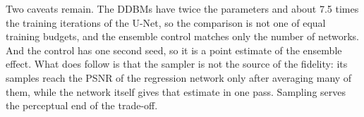 Two caveats remain. The DDBMs have twice the parameters and about 7.5 times the training iterations of the U-Net, so the comparison is not one of equal training budgets, and the ensemble control matches only the number of networks. And the control has one second seed, so it is a point estimate of the ensemble effect. What does follow is that the sampler is not the source of the fidelity: its samples reach the PSNR of the regression network only after averaging many of them, while the network itself gives that estimate in one pass. Sampling serves the perceptual end of the trade-off.

\begin{table}[tb]
\centering
\caption{Averaging bridge samples and one-step estimates on 100 test pairs, two per scene. NFE: network evaluations per image, with the SID U-Net counted once where it is used. One sample is the mean over four draws. Samples are 40-step samples of the two full DDBMs, started from the naive rendering and from the U-Net output. The best value per column is in bold.}
\label{tab:ms}
\small
{}
\end{table}

